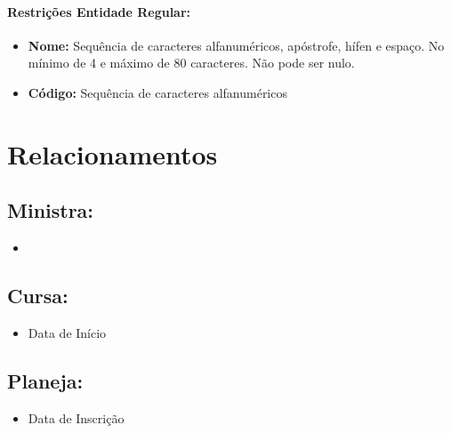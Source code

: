 \documentclass{report}
\begin{document}
\paragraph{Restrições Entidade Regular:}
\begin{itemize}
  \item \textbf{Nome:} Sequência de caracteres alfanuméricos, apóstrofe, hífen e espaço. No mínimo de 4 e máximo de 80 caracteres. Não pode ser nulo.
  \item \textbf{Código:} Sequência de caracteres alfanuméricos
\end{itemize}
\section{Relacionamentos}

\subsection{Ministra:}
\begin{itemize}
  \item
\end{itemize}

\subsection{Cursa:}
\begin{itemize}
  \item Data de Início
\end{itemize}

\subsection{Planeja:}
\begin{itemize}
  \item Data de Inscrição
\end{itemize}
\end{document}
